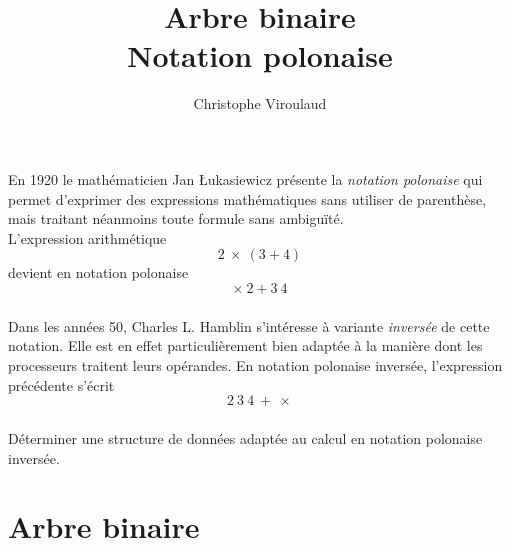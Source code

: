 \documentclass[svgnames,11pt]{beamer}
\author[]{Christophe Viroulaud}
\title{Arbre binaire\\Notation polonaise}
\date{\framebox{\textbf{Algo 06}}}
\institute{Terminale - NSI}
\begin{document}
\begin{frame}
    \titlepage
\end{frame}
\begin{frame}
    \frametitle{}
    En 1920 le mathématicien Jan Łukasiewicz présente la \emph{notation polonaise} qui permet d'exprimer des expressions mathématiques sans utiliser de parenthèse, mais traitant néanmoins toute formule sans ambiguïté.\\
    L'expression arithmétique
    $$2~×~(3+4)$$
    devient en notation polonaise
    $$×~2+3~4$$


\end{frame}
\begin{frame}
    \frametitle{}

    Dans les années 50, Charles L. Hamblin s'intéresse à variante \emph{inversée} de cette notation. Elle est en effet particulièrement bien adaptée à la manière dont les processeurs traitent leurs opérandes.
    En notation polonaise inversée, l'expression précédente s'écrit
    $$2~3~4~+~×$$
\end{frame}
\begin{frame}
    \frametitle{}

    \begin{framed}
        Déterminer une structure de données adaptée au calcul en notation polonaise inversée.
    \end{framed}

\end{frame}
\section{Arbre binaire}
\end{document}
